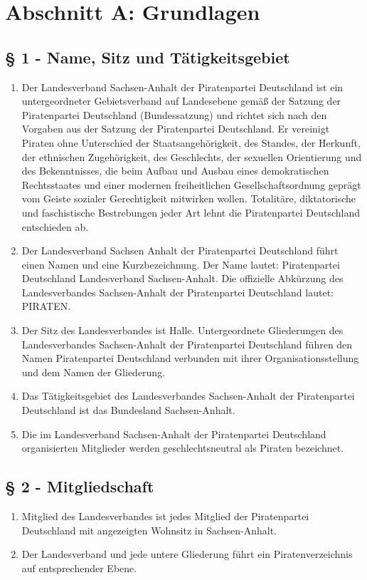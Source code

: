 \section{Abschnitt A: Grundlagen}

\subsection{§ 1 - Name, Sitz und Tätigkeitsgebiet}
\begin{enumerate}
\item Der Landesverband Sachsen-Anhalt der Piratenpartei Deutschland ist ein
untergeordneter Gebietsverband auf Landesebene gemäß der Satzung der
Piratenpartei Deutschland (Bundessatzung) und richtet sich nach den Vorgaben aus
der Satzung der Piratenpartei Deutschland. Er vereinigt Piraten ohne Unterschied
der Staatsangehörigkeit, des Standes, der Herkunft, der ethnischen
Zugehörigkeit, des Geschlechts, der sexuellen Orientierung und des
Bekenntnisses, die beim Aufbau und Ausbau eines demokratischen Rechtsstaates
und einer modernen freiheitlichen Gesellschaftsordnung geprägt vom Geiste
sozialer Gerechtigkeit mitwirken wollen. Totalitäre, diktatorische und
faschistische Bestrebungen jeder Art lehnt die Piratenpartei Deutschland
entschieden ab.

\item Der Landesverband Sachsen Anhalt der Piratenpartei Deutschland führt einen
Namen und eine Kurzbezeichnung. Der Name lautet: Piratenpartei Deutschland
Landesverband Sachsen-Anhalt. Die offizielle Abkürzung des Landesverbandes
Sachsen-Anhalt der Piratenpartei Deutschland lautet: PIRATEN.

\item Der Sitz des Landesverbandes ist Halle. Untergeordnete Gliederungen des
Landesverbandes Sachsen-Anhalt der Piratenpartei Deutschland führen den Namen
Piratenpartei Deutschland verbunden mit ihrer Organisationsstellung und dem
Namen der Gliederung.

\item Das Tätigkeitsgebiet des Landesverbandes Sachsen-Anhalt der Piratenpartei
Deutschland ist das Bundesland Sachsen-Anhalt.

\item Die im Landesverband Sachsen-Anhalt der Piratenpartei Deutschland
organisierten Mitglieder werden geschlechtsneutral als Piraten bezeichnet.
\end{enumerate}

\subsection{§ 2 - Mitgliedschaft}
\begin{enumerate}
\item Mitglied des Landesverbandes ist jedes Mitglied der Piratenpartei Deutschland 
mit angezeigten Wohnsitz in Sachsen-Anhalt.

\item Der Landesverband und jede untere Gliederung führt ein Piratenverzeichnis
auf entsprechender Ebene.
\end{enumerate}

